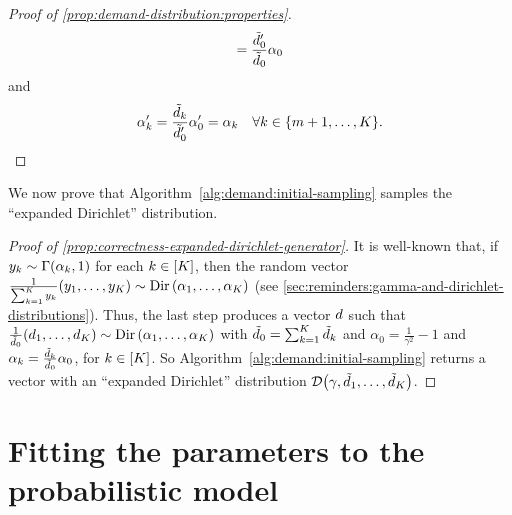 \begin{proof}[Proof of \cref{prop:demand-distribution:properties}]
\begin{equation}
  = \frac{\tilde{d}_0'}{\tilde{d}_0}\alpha_0
\end{equation}
and
\begin{equation}
  \alpha_k' = \frac{\tilde{\demand}_k}{\tilde{\demand}_0'}\alpha_0' = \alpha_k\quad\forall k\in\range[m+1]{K}.
\end{equation}
\end{proof}


We now prove that Algorithm~\ref{alg:demand:initial-sampling} samples the ``expanded Dirichlet'' distribution.


\begin{proof}[Proof of \cref{prop:correctness-expanded-dirichlet-generator}]
It is well-known that, if $y_k\sim\Gamma\bracket{\alpha_k,1}$ for each $k\in\range{K}$, then the random vector $\frac{1}{\sum_{k=1}^K y_k}\bracket{y_1,\ldots,y_K}\sim\Dir\bracket{\alpha_1,\ldots,\alpha_K}$ (see \cref{sec:reminders:gamma-and-dirichlet-distributions}).
Thus, the last step produces a vector $d$ such that $\frac{1}{\tilde{\demand}_0}\bracket{\demand_1,\ldots,\demand_K}\sim\Dir\bracket{\alpha_1,\ldots,\alpha_K}$ with $\tilde{d}_0 = \sum_{k=1}^K\tilde{d}_k$ and $\alpha_0 = \frac{1}{\gamma^2}-1$ and $\alpha_k=\frac{\tilde{d}_k}{\tilde{d}_0}\alpha_0$, for $k\in\range{K}$.
So Algorithm~\ref{alg:demand:initial-sampling} returns a vector with an ``expanded Dirichlet'' distribution $\cD\bracket{\gamma,\tilde{\demand}_1,\ldots,\tilde{\demand}_K}$.
\end{proof}


\section{Fitting the parameters to the probabilistic model}
\label{sec:PDP:numerical-experiments:instances:fitting-parameters}



